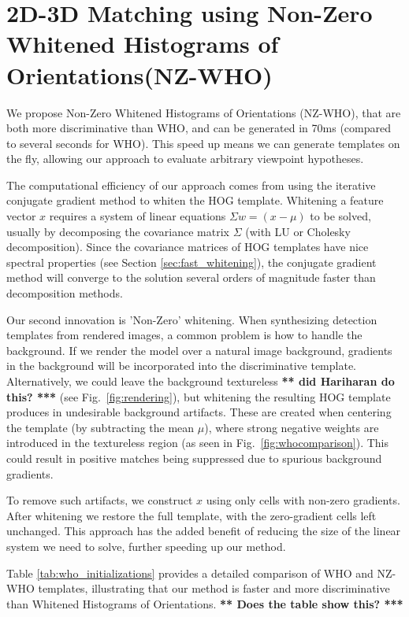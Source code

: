 \documentclass[10pt,twocolumn,letterpaper]{article}
\newcommand{\scream}[1]{{\color{red} \bf *** #1 ***}}
\begin{document}
\section{2D-3D Matching using Non-Zero Whitened Histograms of Orientations(NZ-WHO)}
\label{sec:nz-who}

We propose Non-Zero Whitened Histograms of Orientations (NZ-WHO), that are both more discriminative than WHO, and can be generated in 70ms (compared to several seconds for WHO). This speed up means we can generate templates on the fly, allowing our approach to evaluate arbitrary viewpoint hypotheses. 

The computational efficiency of our approach comes from using the iterative conjugate gradient method to whiten the HOG template. Whitening a feature vector $x$ requires a system of linear equations $\Sigma w = (x - \mu)$ to be solved, usually by decomposing the covariance matrix $\Sigma$ (with LU or Cholesky decomposition). Since the covariance matrices of HOG templates have nice spectral properties (see Section \ref{sec:fast_whitening}), the conjugate gradient method will converge to the solution several orders of magnitude faster than decomposition methods.

Our second innovation is 'Non-Zero' whitening. When synthesizing detection templates from rendered images, a common problem is how to handle the background. If we render the model over a natural image background, gradients in the background will be incorporated into the discriminative template. Alternatively, we could leave the background textureless \scream{did Hariharan do this?} (see Fig.~\ref{fig:rendering}), but whitening the resulting HOG template produces in undesirable background artifacts. These are created when centering the template (by subtracting the mean $\mu$), where strong negative weights are introduced in the textureless region (as seen in Fig.~\ref{fig:whocomparison}). This could result in positive matches being suppressed due to spurious background gradients.

To remove such artifacts, we construct $x$ using only cells with non-zero gradients. After whitening we restore the full template, with the zero-gradient cells left unchanged. This approach has the added benefit of reducing the size of the linear system we need to solve, further speeding up our method.

Table \ref{tab:who_initializations} provides a detailed comparison of WHO and NZ-WHO templates, illustrating that our method is faster and more discriminative than Whitened Histograms of Orientations. \scream{Does the table show this?}
\end{document}
